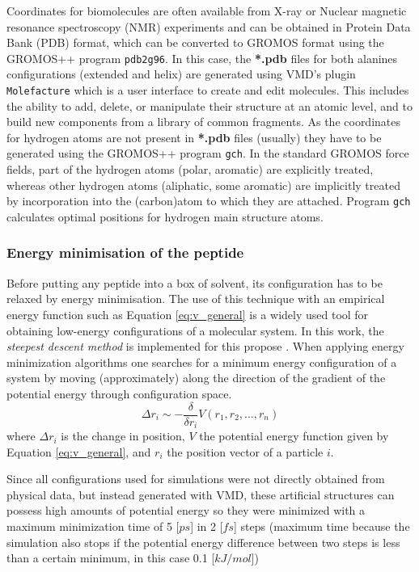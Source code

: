 Coordinates for biomolecules are often available from X-ray or Nuclear magnetic resonance spectroscopy (NMR) experiments and can be obtained in Protein Data Bank (PDB) format, which can be converted to GROMOS format using the GROMOS++ program \texttt{pdb2g96}. In this case, the \textbf{*.pdb} files for both alanines configurations (extended and helix) are generated using VMD's plugin \texttt{Molefacture} which is a user interface to create and edit molecules. This includes the ability to add, delete, or manipulate their structure at an atomic level, and to build new components from a library of common fragments.
As the coordinates for hydrogen atoms are not present in \textbf{*.pdb} files (usually) they have to be generated using the GROMOS++ program \texttt{gch}. In the standard GROMOS force fields, part of the hydrogen atoms (polar, aromatic) are explicitly treated, whereas other hydrogen atoms (aliphatic, some aromatic) are implicitly treated by incorporation into the (carbon)atom to which they are attached. Program \texttt{gch} calculates optimal positions for hydrogen main structure atoms.

\subsubsection{Energy minimisation of the peptide}
Before putting any peptide into a box of solvent, its configuration has to be relaxed by energy minimisation. The use of this technique with an empirical energy function such as Equation \ref{eq:v_general} is a widely used tool for obtaining low-energy configurations of a molecular system. In this work, the \textit{steepest descent method} is implemented for this propose \cite{van1988role}.
When applying energy minimization algorithms one searches for a minimum energy configuration of a system by moving (approximately) along the direction of the gradient of the potential energy through configuration space.
\begin{equation}
    \Delta r_i \sim -\frac{\delta }{\delta r_i}V(r_1,r_2,...,r_n)
    \label{eq:gradient}
\end{equation}
where $\Delta r_i$ is the change in position, $V$ the potential energy function given by Equation \ref{eq:v_general}, and $r_i$ the position vector of a particle $i$. 

Since all configurations used for simulations were not directly obtained from physical data, but instead generated with VMD, these artificial structures can possess high amounts of potential energy so they were minimized with a maximum minimization time of 5 [$ps$] in 2 [$fs$] steps (maximum time because the simulation also stops if the potential energy difference between two steps is less than a certain minimum, in this case 0.1 [$kJ/mol$])

